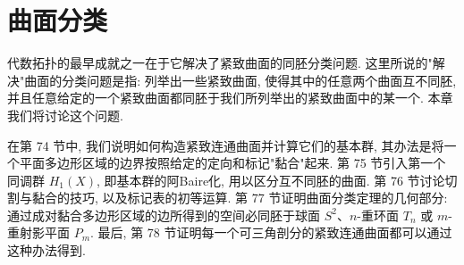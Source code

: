 \chapter{曲面分类}
\label{chapter:ch12}

代数拓扑的最早成就之一在于它解决了紧致曲面的同胚分类问题. 这里所说的"解决"曲面的分类问题是指: 列举出一些紧致曲面, 使得其中的任意两个曲面互不同胚, 并且任意给定的一个紧致曲面都同胚于我们所列举出的紧致曲面中的某一个. 本章我们将讨论这个问题.

在第 74 节中, 我们说明如何构造紧致连通曲面并计算它们的基本群, 其办法是将一个平面多边形区域的边界按照给定的定向和标记"黏合"起来. 第 75 节引入第一个同调群 $H_{1}(X)$, 即基本群的阿Baire化, 用以区分互不同胚的曲面. 第 76 节讨论切割与黏合的技巧, 以及标记表的初等运算. 第 77 节证明曲面分类定理的几何部分: 通过成对黏合多边形区域的边所得到的空间必同胚于球面 $S^{2}$、$n$-重环面 $T_{n}$ 或 $m$-重射影平面 $P_{m}$. 最后, 第 78 节证明每一个可三角剖分的紧致连通曲面都可以通过这种办法得到.






